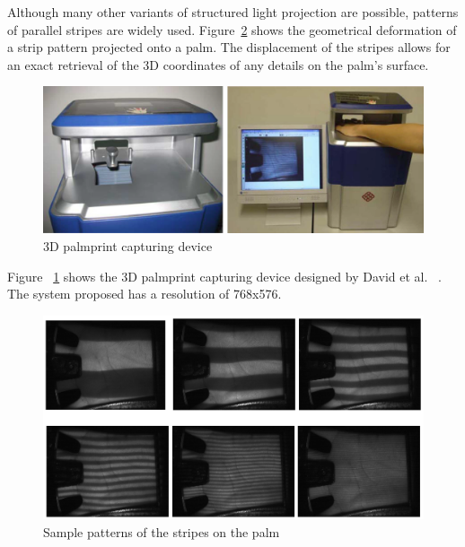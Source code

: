 Although many other variants of structured light projection are possible, patterns of parallel stripes are widely used. Figure~\ref{fig:pastwork:strippattern} shows the geometrical deformation of a strip pattern projected onto a palm. The displacement of the stripes allows for an exact retrieval of the 3D coordinates of any details on the palm's surface.

\begin{figure}[htb]
\begin{center}
\includegraphics[width=0.9\linewidth]{ch-pastwork/figures/device}
\caption{3D palmprint capturing device}
\label{fig:pastwork:device}
\end{center}
\end{figure}

Figure ~\ref{fig:pastwork:device} shows the 3D palmprint capturing device designed by David et al. ~\cite{Zhang:2008kc}. The system proposed has a resolution of 768x576.

\begin{figure}[htb]
\begin{center}
\includegraphics[width=0.9\linewidth]{ch-pastwork/figures/strippattern}
\caption[Sample patterns of the stripes on the palm]{Sample patterns of the stripes on the palm~\cite{Li:2009eq}}
\label{fig:pastwork:strippattern}
\end{center}
\end{figure}

